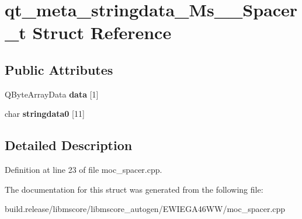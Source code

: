 \hypertarget{structqt__meta__stringdata___ms_____spacer__t}{}\section{qt\+\_\+meta\+\_\+stringdata\+\_\+\+Ms\+\_\+\+\_\+\+Spacer\+\_\+t Struct Reference}
\label{structqt__meta__stringdata___ms_____spacer__t}
\subsection*{Public Attributes}
\begin{DoxyCompactItemize}
\item 
\mbox{\label{structqt__meta__stringdata___ms_____spacer__t_adb9ae5cc2cf092d921b42820c2c1e5bf}} 
Q\+Byte\+Array\+Data {\bfseries data} \mbox{[}1\mbox{]}
\item 
\mbox{\label{structqt__meta__stringdata___ms_____spacer__t_a2178bd525b4176d453215ad618ba424f}} 
char {\bfseries stringdata0} \mbox{[}11\mbox{]}
\end{DoxyCompactItemize}


\subsection{Detailed Description}


Definition at line 23 of file moc\+\_\+spacer.\+cpp.



The documentation for this struct was generated from the following file\+:\begin{DoxyCompactItemize}
\item 
build.\+release/libmscore/libmscore\+\_\+autogen/\+E\+W\+I\+E\+G\+A46\+W\+W/moc\+\_\+spacer.\+cpp\end{DoxyCompactItemize}
